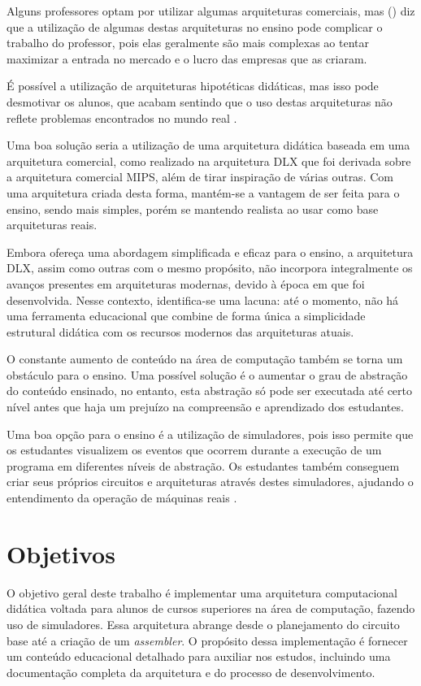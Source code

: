 \documentclass[
	12pt,				%
	openright,			%
	oneside,			%
	a4paper,			%
	english,			%
	french,				%
	spanish,			%
	brazil,				%
	]{abntex2}
\begin{document}
Alguns professores optam por utilizar algumas arquiteturas comerciais, mas (\citeyear{clements_arms_2010}) diz que a utilização de algumas destas arquiteturas no ensino pode complicar o trabalho do professor, pois elas geralmente são mais complexas ao tentar maximizar a entrada no mercado e o lucro das empresas que as criaram.

É possível a utilização de arquiteturas hipotéticas didáticas, mas isso pode desmotivar os alunos, que acabam sentindo que o uso destas arquiteturas não reflete problemas encontrados no mundo real \cite{clements_arms_2010}.

Uma boa solução seria a utilização de uma arquitetura didática baseada em uma arquitetura comercial, como realizado na arquitetura DLX \cite[p. 96-108]{patterson_computer_1996} que foi derivada sobre a arquitetura comercial MIPS, além de tirar inspiração de várias outras. Com uma arquitetura criada desta forma, mantém-se a vantagem de ser feita para o ensino, sendo mais simples, porém se mantendo realista ao usar como base arquiteturas reais.

Embora ofereça uma abordagem simplificada e eficaz para o ensino, a arquitetura DLX, assim como outras com o mesmo propósito, não incorpora integralmente os avanços presentes em arquiteturas modernas, devido à época em que foi desenvolvida. Nesse contexto, identifica-se uma lacuna: até o momento, não há uma ferramenta educacional que combine de forma única a simplicidade estrutural didática com os recursos modernos das arquiteturas atuais.

O constante aumento de conteúdo na área de computação também se torna um obstáculo para o ensino. Uma possível solução é o aumentar o grau de abstração do conteúdo ensinado, no entanto, esta abstração só pode ser executada até certo nível antes que haja um prejuízo na compreensão e aprendizado dos estudantes. \cite[p.176]{wolffe_teaching_2002}

Uma boa opção para o ensino é a utilização de simuladores, pois isso permite que os estudantes visualizem os eventos que ocorrem durante a execução de um programa em diferentes níveis de abstração. Os estudantes também conseguem criar seus próprios circuitos e arquiteturas através destes simuladores, ajudando o entendimento da operação de máquinas reais \cite[p.176-177]{wolffe_teaching_2002}.

\section{Objetivos}\label{sec-objetivos}
O objetivo geral deste trabalho é implementar uma arquitetura computacional didática voltada para alunos de cursos superiores na área de computação, fazendo uso de simuladores. Essa arquitetura abrange desde o planejamento do circuito base até a criação de um \textit{assembler}. O propósito dessa implementação é fornecer um conteúdo educacional detalhado para auxiliar nos estudos, incluindo uma documentação completa da arquitetura e do processo de desenvolvimento.
\end{document}
